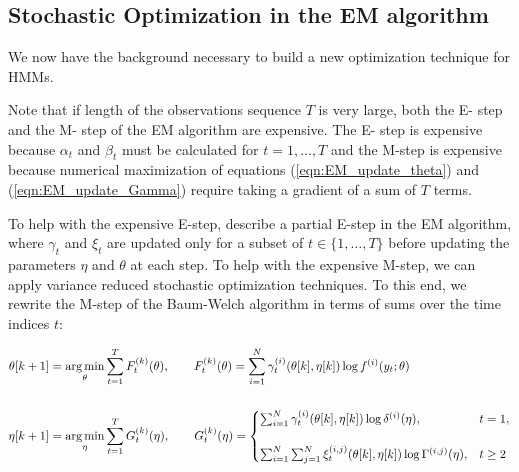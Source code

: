 \subsection{Stochastic Optimization in the EM algorithm}

We now have the background necessary to build a new optimization technique for HMMs. 


Note that if length of the observations sequence $T$ is very large, %
both the E- step and the M- step of the EM algorithm are expensive. The E- step is expensive because $\alpha_t$ and $\beta_t$ must be calculated for $t = 1,\ldots,T$ and the M-step is expensive because numerical maximization of equations (\ref{eqn:EM_update_theta}) and (\ref{eqn:EM_update_Gamma}) require taking a gradient of a sum of $T$ terms.

To help with the expensive E-step, \citet{Neal:1998} describe a partial E-step in the EM algorithm, where $\gamma_t$ and $\xi_t$ are updated only for a subset of $t \in \{1,\ldots,T\}$ before updating the parameters $\eta$ and $\theta$ at each step. To help with the expensive M-step, we can apply variance reduced stochastic optimization techniques. To this end, we rewrite the M-step of the Baum-Welch algorithm in terms of sums over the time indices $t$:

\begin{align}
    \theta[k+1] &= \operatorname*{arg\,min}_{\theta} \sum_{t=1}^T F_t^{(k)}(\theta), \qquad F_t^{(k)}(\theta) = \sum_{i=1}^N \gamma^{(i)}_t(\theta[k], \eta[k]) \log f^{(i)}(y_t;\theta) \label{eqn:F} \\ \nonumber \\
    \eta[k+1] &= \operatorname*{arg\,min}_{\eta} \sum_{t=1}^{T} G_t^{(k)}(\eta), 
    \qquad G_t^{(k)}(\eta) = 
    \begin{cases}
        \sum_{i=1}^N \gamma^{(i)}_t(\theta[k],\eta[k]) \log \delta^{(i)}(\eta), & t = 1, \\\\
        \sum_{i=1}^N \sum_{j=1}^N \xi^{(i,j)}_t(\theta[k], \eta[k]) \log \Gamma^{(i,j)}(\eta), & t \geq 2
    \end{cases}
    \label{eqn:G}
\end{align}

